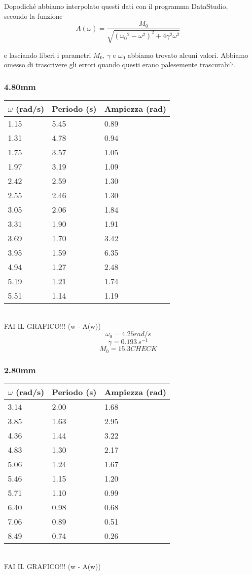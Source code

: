 \documentclass[a4paper,10pt]{report}
\begin{document}
Dopodiché abbiamo interpolato questi dati con il programma DataStudio, secondo la funzione
$$ A(\omega) = \frac{M_0}{\sqrt{ ({\omega_0}^2-\omega^2)^2 + 4\gamma^2\omega^2}} $$

e lasciando liberi i parametri $M_0$, $\gamma$ e $\omega_0$ abbiamo trovato alcuni valori. Abbiamo omesso di trascrivere gli errori quando questi erano palesemente trascurabili.
\\
\subsubsection{4.80mm}
\begin{tabular}{l|l|l}
$\omega$ (rad/s) & Periodo (s) & Ampiezza (rad) \\
\midrule
1.15	& 5.45 & 0.89\\
1.31	& 4.78 & 0.94\\
1.75	& 3.57 & 1.05\\
1.97	& 3.19 & 1.09\\
2.42	& 2.59 & 1.30\\
2.55	& 2.46 & 1.30\\
3.05    & 2.06 & 1.84\\
3.31	& 1.90 & 1.91\\
3.69	& 1.70 & 3.42\\
3.95	& 1.59 & 6.35\\
4.94	& 1.27 & 2.48\\
5.19	& 1.21 & 1.74\\
5.51	& 1.14 & 1.19 \\
\midrule
\end{tabular}
\\
FAI IL GRAFICO!!! (w - A(w))
\\

$$ \omega_0 = 4.25 rad/s $$
$$ \gamma = 0.193\ s^{-1}$$
$$ M_0 = 15.3 CHECK $$

\subsubsection{2.80mm}
\begin{tabular}{l|l|l}
$\omega$ (rad/s) & Periodo (s) & Ampiezza (rad) \\
\midrule
3.14 & 2.00 & 1.68 \\
3.85 & 1.63 & 2.95 \\
4.36 & 1.44 & 3.22 \\
4.83 & 1.30 & 2.17 \\
5.06 & 1.24 & 1.67 \\
5.46 & 1.15 & 1.20 \\
5.71 & 1.10 & 0.99 \\
6.40 & 0.98 & 0.68 \\
7.06 & 0.89 & 0.51 \\
8.49 & 0.74 & 0.26 \\
\midrule
\end{tabular}
\\
FAI IL GRAFICO!!! (w - A(w))
\\
\end{document}
